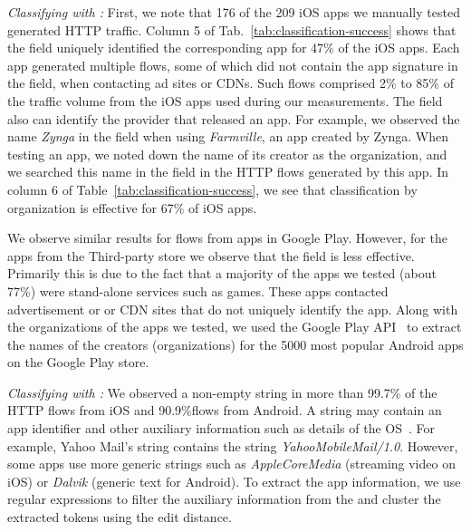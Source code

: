 \emph{Classifying with \httphost:}
First, we note that 176 of the 209 iOS apps we manually tested generated HTTP traffic.
Column 5 of Tab.~\ref{tab:classification-success} shows that the \httphost field uniquely identified the corresponding app for 47\% of the iOS apps. 
Each app generated multiple flows, some of which did not contain the app signature in the \httphost field, \eg when contacting ad sites or CDNs. 
Such flows comprised 2\% to 85\% of the traffic volume from the iOS apps used during our measurements. 
The \httphost field also can identify the provider that released an app.
For example, we observed the name \emph{Zynga} in the \httphost field when using \emph{Farmville}, an app created by Zynga.
When testing an app, we noted down the name of its creator as the organization, and we searched this name in the \httphost field in the HTTP flows generated by this app.  
In column 6 of Table~\ref{tab:classification-success}, we see that classification by organization is effective for 67\% of iOS apps. 

We observe similar results for flows from apps in Google Play.
However, for the apps from the Third-party store we observe that the \httphost field is less effective. 
Primarily this is due to the fact that a majority of the apps we tested (about 77\%) were stand-alone services such as games. 
These apps contacted advertisement or or CDN sites that do not uniquely identify the app.
Along with the organizations of the apps we tested, we used the Google Play API~\cite{googleplay:api} to extract the names of the creators (organizations) for the 5000 most popular Android apps on the Google Play store. 

\emph{Classifying with \useragent:} 
We observed a non-empty \useragent string in more than 99.7\% of the HTTP flows from iOS and 90.9\%flows from Android. 
A \useragent string may contain an app identifier and other auxiliary information such as details of the OS~\cite{mozilla:useragentdetection}. 
For example, Yahoo Mail's \useragent string contains the string \emph{YahooMobileMail/1.0}. 
However, some apps use more generic \useragent strings such as \emph{AppleCoreMedia} (streaming video on iOS) or \emph{Dalvik} (generic text for Android). 
To extract the app information, we use regular expressions to filter the auxiliary information from the \useragent and cluster the extracted tokens using the edit distance.

